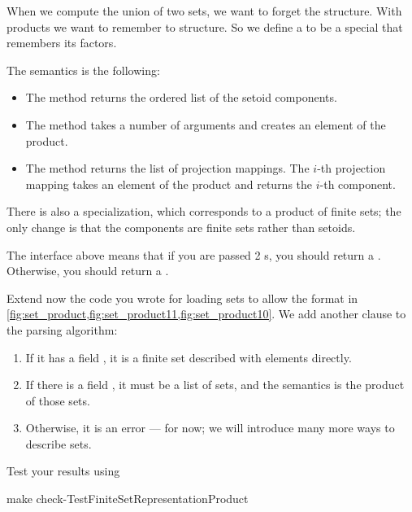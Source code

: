 
When we compute the union of two sets, we want to forget the structure.
With products we want to remember to structure.
So we define a  to be a special \Setoid that remembers its factors.


The semantics is the following:
\begin{itemize}
    \item The method  returns the ordered list of the setoid components.
    \item The method  takes a number of arguments and creates an element of the product.
    \item The method  returns the list of projection mappings.
          The $i$-th projection mapping takes an element of the product and returns the $i$-th component.
\end{itemize}

There is also a specialization, which corresponds to a product of finite sets; the only change is that the components are finite sets rather than setoids.



The interface above means that if you are passed 2 \FiniteSet{}s, you should return a \FiniteSet.
Otherwise, you should return a \Setoid.


%

%

\begin{codeexercise}
    Extend now the code you wrote for loading sets to allow the format in \cref{fig:set_product,fig:set_product11,fig:set_product10}.
    We add another clause to the parsing algorithm:
    \begin{enumerate}
        \item If it has a field , it is a finite set described with elements directly.
        \item If there is a field , it must be a list of sets, and the semantics is the product of those sets.
        \item Otherwise, it is an error --- for now; we will introduce many more ways to describe sets.
    \end{enumerate}
    Test your results using
    \begin{console}
        make check-TestFiniteSetRepresentationProduct
    \end{console}
\end{codeexercise}
